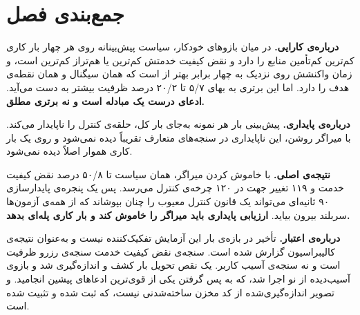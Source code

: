 \section{جمع‌بندی فصل}
\label{sec:results-summary}

\textbf{درباره‌ی کارایی.} در میان بازوهای خودکار، سیاست پیش‌بینانه روی هر چهار بار کاری
کم‌ترین کم‌تأمین منابع را دارد و نقض کیفیت خدمتش کم‌ترین یا هم‌تراز کم‌ترین است، و زمان
واکنشش روی  نزدیک به چهار برابر بهتر از
 است که همان سیگنال و همان نقطه‌ی هدف را دارد. اما این برتری به بهای ۵/۷ تا ۲۰/۲
درصد ظرفیت بیشتر به دست می‌آید. \textbf{ادعای درست یک مبادله است و نه برتری مطلق.}

\textbf{درباره‌ی پایداری.} پیش‌بینی بار هر نمونه به‌جای بار کل، حلقه‌ی کنترل را ناپایدار
می‌کند. با میراگر روشن، این ناپایداری در سنجه‌های متعارف تقریباً دیده نمی‌شود و روی یک بار
کاری هموار اصلاً دیده نمی‌شود.

\textbf{نتیجه‌ی اصلی.} با خاموش کردن میراگر، همان سیاست تا ۵۰/۸ درصد نقض کیفیت خدمت و ۱۱۹
تغییر جهت در ۱۲۰ چرخه‌ی کنترل می‌رسد. پس یک پنجره‌ی پایدارسازی ۹۰ ثانیه‌ای می‌تواند یک قانون
کنترل معیوب را چنان بپوشاند که از همه‌ی آزمون‌ها سربلند بیرون بیاید. \textbf{ارزیابی پایداری
باید میراگر را خاموش کند و بار کاری پله‌ای بدهد.}

\textbf{درباره‌ی اعتبار.} تأخیر در بازه‌ی بار این آزمایش تفکیک‌کننده نیست و به‌عنوان نتیجه‌ی
کالیبراسیون گزارش شده است. سنجه‌ی نقض کیفیت خدمت سنجه‌ی رزرو ظرفیت است و نه سنجه‌ی آسیب
کاربر. یک نقص تحویل بار کشف و اندازه‌گیری شد و بازوی آسیب‌دیده از نو اجرا شد، که به پس گرفتن
یکی از قوی‌ترین ادعاهای پیشین انجامید. و تصویر اندازه‌گیری‌شده از کد مخزن ساخته‌شدنی نیست،
که ثبت شده و تثبیت شده است.
